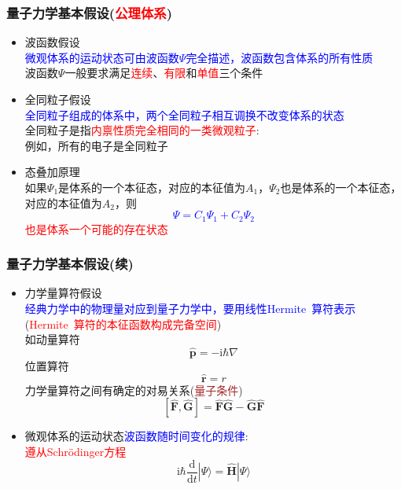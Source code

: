 \frame
{
	\frametitle{量子力学基本假设(\textcolor{red}{公理体系})}
	\begin{itemize}
		\item 波函数假设\\
			\textcolor{blue}{微观体系的运动状态可由波函数$\Psi$完全描述，波函数包含体系的所有性质}\\
			波函数$\Psi$一般要求满足\textcolor{red}{连续}、\textcolor{red}{有限}和\textcolor{red}{单值}三个条件
		\item 全同粒子假设\\
			\textcolor{blue}{全同粒子组成的体系中，两个全同粒子相互调换不改变体系的状态}\\ 
			全同粒子是指\textcolor{red}{内禀性质完全相同的一类微观粒子}:\\例如，所有的电子是全同粒子 
		\item 态叠加原理\\
			如果$\Psi_1$是体系的一个本征态，对应的本征值为$A_1$，$\Psi_2$也是体系的一个本征态，对应的本征值为$A_2$，则\textcolor{blue}{$$\Psi=C_1\Psi_1+C_2\Psi_2$$}\textcolor{red}{也是体系一个可能的存在状态}
	\end{itemize}
}

\frame
{
	\frametitle{量子力学基本假设(续)}
	\begin{itemize}
		\item 力学量算符假设\\
			\textcolor{blue}{经典力学中的物理量对应到量子力学中，要用线性\textrm{Hermite~}算符表示}(\textcolor{red}{\textrm{Hermite~}算符的本征函数构成完备空间})\\
			如动量算符 
			$$\hat{\mathbf{p}}=-\mathrm{i}\hbar\nabla$$
			位置算符$$\hat{\mathbf r}=r$$
			力学量算符之间有确定的对易关系(\textcolor{brown}{量子条件})
			$$[\hat{\mathbf F},\hat{\mathbf G}]=\hat{\mathbf F}\hat{\mathbf G}-\hat{\mathbf G}\hat{\mathbf F}$$ 
			
		\item 微观体系的运动状态\textcolor{blue}{波函数随时间变化的规律}:\\\textcolor{red}{遵从\textrm{Schr\"odinger}方程}
			$$\mathrm{i}\hbar\dfrac{\mathrm{d}}{\mathrm{d}t}|\Psi\rangle=\hat{\mathbf H}|\Psi\rangle$$
	\end{itemize}
}

%

